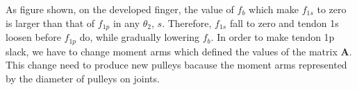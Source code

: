 \documentclass{llncs}
\begin{document}
As figure shown, on the developed finger, the value of $f_b$ which make $f_{1s}$ to zero is larger than that of $f_{1p}$ in any $\theta_2$, $s$.
Therefore, $f_{1s}$ fall to zero and tendon 1s loosen before $f_{1p}$ do, while gradually lowering $f_b$.
In order to make tendon 1p slack, we have to change moment arms which defined the values of the matrix $\bm{A}$.
This change need to produce new pulleys bacause the moment arms represented by the diameter of pulleys on joints.
			

\end{document}
